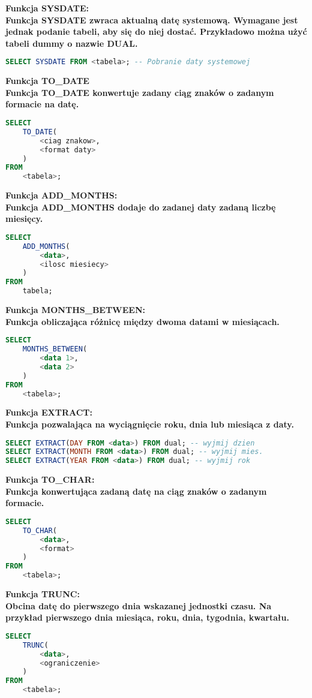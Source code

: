 \documentclass[a4paper,12pt]{article}
\newcommand{\h}[1]{\noindent \bf #1 \rm \\ \noindent}
\begin{document}
\h{Funkcja SYSDATE:}
Funkcja SYSDATE zwraca aktualną datę systemową. Wymagane jest jednak podanie tabeli, aby się do niej dostać. Przykładowo można użyć tabeli dummy o nazwie DUAL.
\begin{lstlisting}[language=SQL]
SELECT SYSDATE FROM <tabela>; -- Pobranie daty systemowej
\end{lstlisting}
\vspace{5mm}

\h{Funkcja TO\_DATE}
Funkcja TO\_DATE konwertuje zadany ciąg znaków o zadanym formacie na datę. 
\begin{lstlisting}[language=SQL]
SELECT 
	TO_DATE(
		<ciag znakow>, 
		<format daty>
	)
FROM
	<tabela>;
\end{lstlisting}
\vspace{5mm}

\newpage
\h{Funkcja ADD\_MONTHS:}
Funkcja ADD\_MONTHS dodaje do zadanej daty zadaną liczbę miesięcy.
\begin{lstlisting}[language=SQL]
SELECT
	ADD_MONTHS(
		<data>,
		<ilosc miesiecy>
	)
FROM
	tabela;
\end{lstlisting}
\vspace{5mm}

\h{Funkcja MONTHS\_BETWEEN:}
Funkcja obliczająca różnicę między dwoma datami w miesiącach.
\begin{lstlisting}[language=SQL]
SELECT
	MONTHS_BETWEEN(
		<data 1>,
		<data 2>
	)
FROM
	<tabela>;
\end{lstlisting}
\vspace{5mm}

\h{Funkcja EXTRACT:}
Funkcja pozwalająca na wyciągnięcie roku, dnia lub miesiąca z daty.
\begin{lstlisting}[language=SQL]
SELECT EXTRACT(DAY FROM <data>) FROM dual; -- wyjmij dzien
SELECT EXTRACT(MONTH FROM <data>) FROM dual; -- wyjmij mies.
SELECT EXTRACT(YEAR FROM <data>) FROM dual; -- wyjmij rok
\end{lstlisting}
\vspace{5mm}

\h{Funkcja TO\_CHAR:}
Funkcja konwertująca zadaną datę na ciąg znaków o zadanym formacie.
\begin{lstlisting}[language=SQL]
SELECT 
	TO_CHAR(
		<data>,
		<format>
	)
FROM
	<tabela>;
\end{lstlisting}
\vspace{5mm}

\newpage
\h{Funkcja TRUNC:}
Obcina datę do pierwszego dnia wskazanej jednostki czasu. Na przykład pierwszego dnia miesiąca, roku, dnia, tygodnia, kwartału.
\begin{lstlisting}[language=SQL]
SELECT
	TRUNC(
		<data>,
		<ograniczenie>
	)
FROM
	<tabela>;
\end{lstlisting}
\vspace{5mm}
\end{document}
